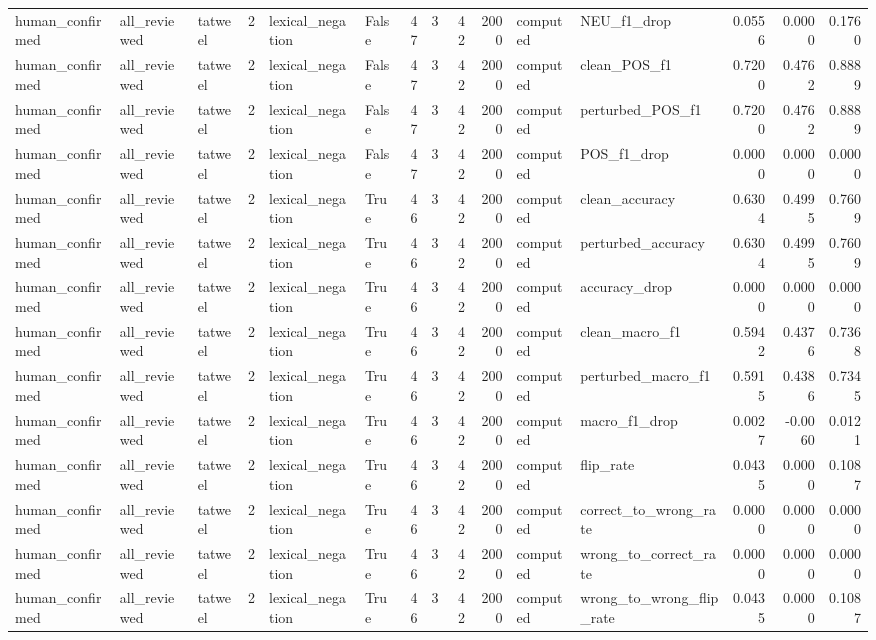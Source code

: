 \begin{tabular}{lllrllrrrrllrrr}
human_confirmed & all_reviewed & tatweel & 2 & lexical_negation & False & 47 & 3 & 42 & 2000 & computed & NEU_f1_drop & 0.0556 & 0.0000 & 0.1760 \\
human_confirmed & all_reviewed & tatweel & 2 & lexical_negation & False & 47 & 3 & 42 & 2000 & computed & clean_POS_f1 & 0.7200 & 0.4762 & 0.8889 \\
human_confirmed & all_reviewed & tatweel & 2 & lexical_negation & False & 47 & 3 & 42 & 2000 & computed & perturbed_POS_f1 & 0.7200 & 0.4762 & 0.8889 \\
human_confirmed & all_reviewed & tatweel & 2 & lexical_negation & False & 47 & 3 & 42 & 2000 & computed & POS_f1_drop & 0.0000 & 0.0000 & 0.0000 \\
human_confirmed & all_reviewed & tatweel & 2 & lexical_negation & True & 46 & 3 & 42 & 2000 & computed & clean_accuracy & 0.6304 & 0.4995 & 0.7609 \\
human_confirmed & all_reviewed & tatweel & 2 & lexical_negation & True & 46 & 3 & 42 & 2000 & computed & perturbed_accuracy & 0.6304 & 0.4995 & 0.7609 \\
human_confirmed & all_reviewed & tatweel & 2 & lexical_negation & True & 46 & 3 & 42 & 2000 & computed & accuracy_drop & 0.0000 & 0.0000 & 0.0000 \\
human_confirmed & all_reviewed & tatweel & 2 & lexical_negation & True & 46 & 3 & 42 & 2000 & computed & clean_macro_f1 & 0.5942 & 0.4376 & 0.7368 \\
human_confirmed & all_reviewed & tatweel & 2 & lexical_negation & True & 46 & 3 & 42 & 2000 & computed & perturbed_macro_f1 & 0.5915 & 0.4386 & 0.7345 \\
human_confirmed & all_reviewed & tatweel & 2 & lexical_negation & True & 46 & 3 & 42 & 2000 & computed & macro_f1_drop & 0.0027 & -0.0060 & 0.0121 \\
human_confirmed & all_reviewed & tatweel & 2 & lexical_negation & True & 46 & 3 & 42 & 2000 & computed & flip_rate & 0.0435 & 0.0000 & 0.1087 \\
human_confirmed & all_reviewed & tatweel & 2 & lexical_negation & True & 46 & 3 & 42 & 2000 & computed & correct_to_wrong_rate & 0.0000 & 0.0000 & 0.0000 \\
human_confirmed & all_reviewed & tatweel & 2 & lexical_negation & True & 46 & 3 & 42 & 2000 & computed & wrong_to_correct_rate & 0.0000 & 0.0000 & 0.0000 \\
human_confirmed & all_reviewed & tatweel & 2 & lexical_negation & True & 46 & 3 & 42 & 2000 & computed & wrong_to_wrong_flip_rate & 0.0435 & 0.0000 & 0.1087 \\

\end{tabular}
